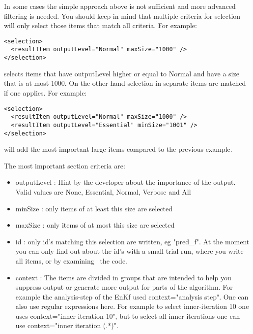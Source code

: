 
In some cases the simple approach above is not sufficient and more advanced
filtering is needed. You should keep in mind that multiple criteria for
selection will only select those items that match all criteria. For example:
\begin{verbatim}
<selection>
  <resultItem outputLevel="Normal" maxSize="1000" />
</selection>
\end{verbatim}
selects items that have outputLevel higher or equal to Normal and have a size
that is at most 1000. On the other hand selection in separate items are matched
if one applies. For example:
\begin{verbatim}
<selection>
  <resultItem outputLevel="Normal" maxSize="1000" />
  <resultItem outputLevel="Essential" minSize="1001" />
</selection>
\end{verbatim}
will add the most important large items compared to the previous example.

The most important section criteria are:
\begin{itemize}
\item outputLevel : Hint by the developer about the importance of the output.
Valid values are None, Essential, Normal, Verbose and All
\item minSize : only items of at least this size are selected
\item maxSize : only items of at most this size are selected
\item id : only id's matching this selection are written, eg "pred\_f". At the
moment you can only find out about the id's with a small trial run, where you
write all items, or by examining  the code.
\item context : The items are divided in groups that are intended to help you
suppress output or generate more output for parts of the algorithm. For example
the analysis-step of the EnKf used context="analysis step". One can also use
regular expressions here. For example to select inner-iteration 10 one uses
context="inner iteration 10", but to select all inner-iterations one can use
context="inner iteration (.*)".
\end{itemize}


